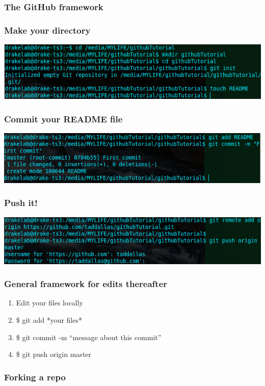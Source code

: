 \documentclass{beamer}\usepackage{graphicx, color}
\begin{document}
\begin{frame}
 \frametitle{The GitHub framework}




\end{frame}




\begin{frame}
 \frametitle{\textbf{Make your directory}}

 \includegraphics[width=\textwidth]{mkdir.png}\\
\end{frame}

\begin{frame}
\frametitle{\textbf{Commit your README file}}
 \includegraphics[width=\textwidth]{add.png}\\
\end{frame}

\begin{frame}
\frametitle{\textbf{Push it!}}
 \includegraphics[width=\textwidth]{push.png}\\
\end{frame}


\begin{frame}
 \frametitle{General framework for edits thereafter}
\begin{block}{}
 \begin{enumerate}
  \item Edit your files locally
  \item \$ git add *your files*
  \item \$ git commit -m ``message about this commit''
  \item \$ git push origin master 
 \end{enumerate}
\end{block}
\end{frame}



\begin{frame}
 \frametitle{Forking a repo}

\end{frame}
\end{document}
